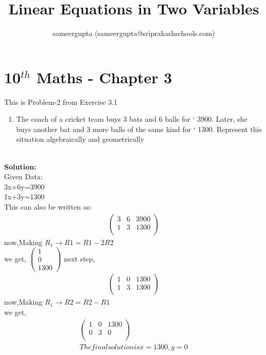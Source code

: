 \documentclass[12pt]{article}
\title{Linear Equations in Two Variables}
\author{sameergupta (sameergupta@sriprakashschools.com)}
\newcommand{\myvec}[1]{\ensuremath{\begin{pmatrix}#1\end{pmatrix}}}
\newcommand{\solution}{\noindent \textbf{Solution: }}
\begin{document}
\maketitle
\section*{10$^{th}$ Maths - Chapter 3}
This is Problem-2 from Exercise 3.1
\begin{enumerate}
\item The coach of a cricket team buys 3 bats and 6 balls for ` 3900. Later, she buys another bat and 3 more balls of the same kind for ` 1300. Represent this situation algebraically and geometrically\\\\
\end{enumerate}
\solution \\
Given Data:\\
            3x+6y=3900\\
            1x+3y=1300\\

This can also be written as:
\begin{align}
\myvec{3&6&3900\\1&3&1300\\}
\end{align}
now,Making $R_1 \xrightarrow\ R1= R1-2R2$\\ 
we get,
\myvec{1\\0\\1300}
next step,
\begin{align}
\myvec{1&0&1300\\1&3&1300\\}
\end{align}
now,Making $R_1 \xrightarrow\ R2= R2-R1$\\
we get,
\begin{align}
\myvec{1&0&1300\\0&3&0\\}\\
The final solution is x=1300,y=0
\end{align}
\end{document}
